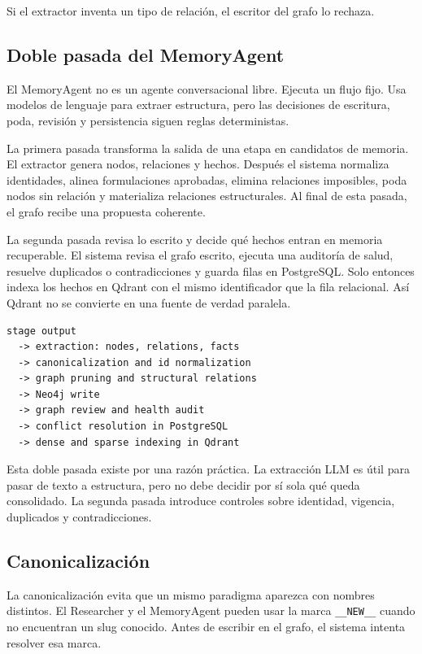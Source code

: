 Si el extractor inventa un tipo de relación, el escritor del grafo lo rechaza.

\subsection{Doble pasada del MemoryAgent}

El MemoryAgent no es un agente conversacional libre. Ejecuta un flujo fijo.
Usa modelos de lenguaje para extraer estructura, pero las decisiones de
escritura, poda, revisión y persistencia siguen reglas deterministas.

La primera pasada transforma la salida de una etapa en candidatos de memoria.
El extractor genera nodos, relaciones y hechos. Después el sistema normaliza
identidades, alinea formulaciones aprobadas, elimina relaciones imposibles,
poda nodos sin relación y materializa relaciones estructurales. Al final de
esta pasada, el grafo recibe una propuesta coherente.

La segunda pasada revisa lo escrito y decide qué hechos entran en memoria
recuperable. El sistema revisa el grafo escrito, ejecuta una auditoría de
salud, resuelve duplicados o contradicciones y guarda filas en PostgreSQL. Solo
entonces indexa los hechos en Qdrant con el mismo identificador que la fila
relacional. Así Qdrant no se convierte en una fuente de verdad paralela.

\begin{lstlisting}
stage output
  -> extraction: nodes, relations, facts
  -> canonicalization and id normalization
  -> graph pruning and structural relations
  -> Neo4j write
  -> graph review and health audit
  -> conflict resolution in PostgreSQL
  -> dense and sparse indexing in Qdrant
\end{lstlisting}

Esta doble pasada existe por una razón práctica. La extracción LLM es útil para
pasar de texto a estructura, pero no debe decidir por sí sola qué queda
consolidado. La segunda pasada introduce controles sobre identidad, vigencia,
duplicados y contradicciones.

\subsection{Canonicalización}

La canonicalización evita que un mismo paradigma aparezca con nombres
distintos. El Researcher y el MemoryAgent pueden usar la marca
\texttt{\_\_NEW\_\_} cuando no encuentran un slug conocido. Antes de escribir
en el grafo, el sistema intenta resolver esa marca.

